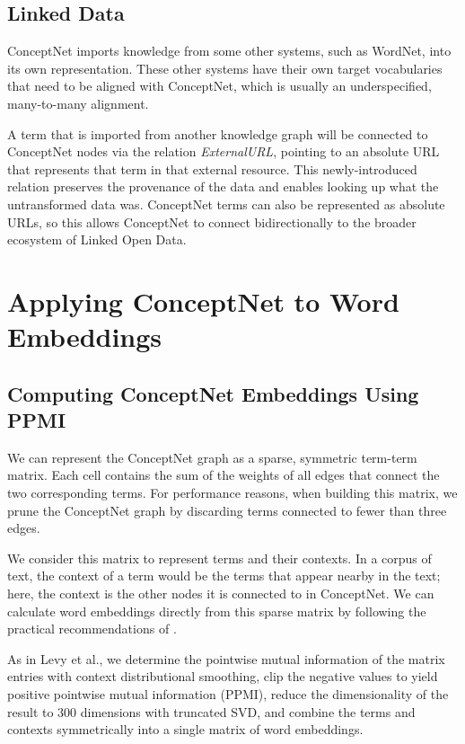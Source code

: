 \documentclass[letterpaper]{article}
\begin{document}
\subsection{Linked Data}

ConceptNet imports knowledge from some other systems, such as WordNet, into its
own representation. These other systems have their own target vocabularies that
need to be aligned with ConceptNet, which is usually an underspecified,
many-to-many alignment.

A term that is imported from another knowledge graph will be connected to
ConceptNet nodes via the relation \emph{ExternalURL}, pointing to an absolute
URL that represents that term in that external resource. This newly-introduced
relation preserves the provenance of the data and enables looking up what the
untransformed data was. ConceptNet terms can also be represented as absolute
URLs, so this allows ConceptNet to connect bidirectionally to the broader
ecosystem of Linked Open Data.

\section{Applying ConceptNet to Word Embeddings}

\subsection{Computing ConceptNet Embeddings Using PPMI}

We can represent the ConceptNet graph as a sparse, symmetric term-term matrix.
Each cell contains the sum of the weights of all edges that connect the two
corresponding terms. For performance reasons, when building this matrix, we
prune the ConceptNet graph by discarding terms connected to fewer than three
edges.

We consider this matrix to represent terms and their contexts. In a corpus of
text, the context of a term would be the terms that appear nearby in the text;
here, the context is the other nodes it is connected to in ConceptNet. We can
calculate word embeddings directly from this sparse matrix by following the
practical recommendations of \citeauthor{levy2015embeddings}
.

As in Levy et al., we determine the pointwise mutual information of the matrix
entries with context distributional smoothing, clip the negative values to
yield positive pointwise mutual information (PPMI), reduce the dimensionality
of the result to 300 dimensions with truncated SVD, and combine the terms and contexts
symmetrically into a single matrix of word embeddings.
\end{document}
